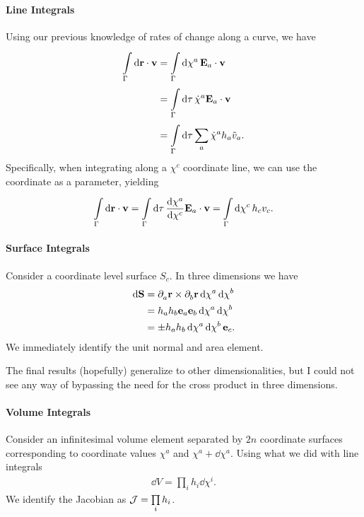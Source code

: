 \paragraph{Line Integrals}
Using our previous knowledge of rates of change along a curve, we have
\begin{align*}
	\int\limits_{\Gamma}^{}\dd{\vb{r}}\cdot \vb{v} &= \int\limits_{\Gamma}^{}\dd{\chi^{a}}{\vb{E}_{a}\cdot\vb{v}} \\
	                             &= \int\limits_{\Gamma}^{}\dd{\tau}{\dot{\chi}^{a}\vb{E}_{a}\cdot\vb{v}} \\
	                             &= \int\limits_{\Gamma}^{}\dd{\tau}{\sum\limits_{a}\dot{\chi}^{a}h_{a}\tilde{v}_{a}}.
\end{align*}
Specifically, when integrating along a $\chi^{c}$ coordinate line, we can use the coordinate as a parameter, yielding
\begin{align*}
	\int\limits_{\Gamma}^{}\dd{\vb{r}}\cdot \vb{v} = \int\limits_{\Gamma}^{}\dd{\tau}{\dv{\chi^{a}}{\chi^{c}}\vb{E}_{a}\cdot\vb{v}} = \int\limits_{\Gamma}^{}\dd{\chi^{c}}{h_{c}v_{c}}.
\end{align*}

\paragraph{Surface Integrals}
Consider a coordinate level surface $S_{c}$. In three dimensions we have
\begin{align*}
	\dd{\vb{S}} &= \partial^{}_{a}{\vb{r}}\times\partial^{}_{b}{\vb{r}}\dd{\chi^{a}}\dd{\chi^{b}} \\
	            &= h_{a}h_{b}\vb{e}_{a}\vb{e}_{b}\dd{\chi^{a}}\dd{\chi^{b}} \\
	            &= \pm h_{a}h_{b}\dd{\chi^{a}}\dd{\chi^{b}}\vb{e}_{c}.
\end{align*}
We immediately identify the unit normal and area element.

The final results (hopefully) generalize to other dimensionalities, but I could not see any way of bypassing the need for the cross product in three dimensions.

\paragraph{Volume Integrals}
Consider an infinitesimal volume element separated by $2n$ coordinate surfaces corresponding to coordinate values $\chi^{a}$ and $\chi^{a} + \dd{\chi^{a}}$. Using what we did with line integrals
\begin{align*}
	\dd{V} = \prod\limits_{i}h_{i}\dd{\chi^{i}}.
\end{align*}
We identify the Jacobian as $\mathcal{J} = \prod\limits_{i}h_{i}$.